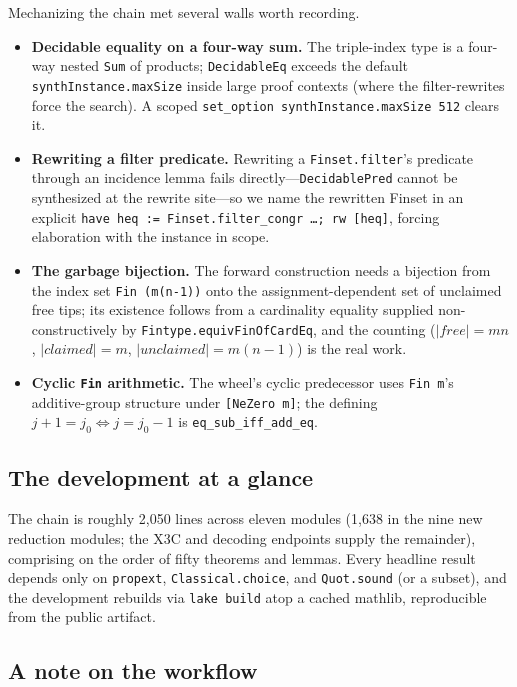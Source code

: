 \documentclass[a4paper,UKenglish,cleveref,autoref]{lipics-v2021}
\begin{document}
Mechanizing the chain met several walls worth recording.
\begin{itemize}
  \item \textbf{Decidable equality on a four-way sum.} The triple-index type is a four-way nested
    \lstinline{Sum} of products; \lstinline{DecidableEq} exceeds the default \lstinline{synthInstance.maxSize}
    inside large proof contexts (where the filter-rewrites force the search). A scoped
    \lstinline{set_option synthInstance.maxSize 512} clears it.
  \item \textbf{Rewriting a filter predicate.} Rewriting a \lstinline{Finset.filter}'s predicate through an
    incidence lemma fails directly---\lstinline{DecidablePred} cannot be synthesized at the rewrite site---so we
    name the rewritten Finset in an explicit \lstinline{have heq := Finset.filter_congr …; rw [heq]}, forcing
    elaboration with the instance in scope.
  \item \textbf{The garbage bijection.} The forward construction needs a bijection from the index set
    \lstinline{Fin (m(n-1))} onto the assignment-dependent set of unclaimed free tips; its existence follows
    from a cardinality equality supplied non-constructively by \lstinline{Fintype.equivFinOfCardEq}, and the
    counting ($|\mathit{free}| = mn$, $|\mathit{claimed}| = m$, $|\mathit{unclaimed}| = m(n{-}1)$) is the real
    work.
  \item \textbf{Cyclic \lstinline{Fin} arithmetic.} The wheel's cyclic predecessor uses \lstinline{Fin m}'s
    additive-group structure under \lstinline{[NeZero m]}; the defining $j{+}1 = j_0 \iff j = j_0{-}1$ is
    \lstinline{eq_sub_iff_add_eq}.
\end{itemize}

\subsection{The development at a glance}\label{sec:metrics}

The chain is roughly 2,050 lines across eleven modules (1,638 in the nine new reduction modules; the X3C and
decoding endpoints supply the remainder), comprising on the order of fifty theorems and lemmas. Every headline
result depends only on \lstinline{propext}, \lstinline{Classical.choice}, and \lstinline{Quot.sound} (or a
subset), and the development rebuilds via \lstinline{lake build} atop a cached mathlib, reproducible from the
public artifact.

\subsection{A note on the workflow}\label{sec:workflow}
\end{document}
